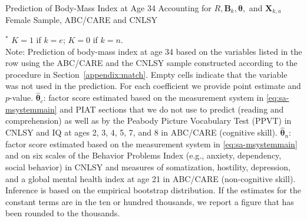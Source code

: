 \begin{table}
\begin{threeparttable}
\caption{Prediction of Body-Mass Index at Age 34 Accounting for $R, \bm{B}_k, \bm{\theta},$ and $\bm{X}_{k,a}$ Female Sample, ABC/CARE and CNLSY}
\centering
\scriptsize

\begin{tablenotes}
\footnotesize
\item $^\ast$ $K=1$ if $k=e$; $K=0$ if $k=n$.\\
Note: Prediction of body-mass index at age 34 based on the variables listed in the row using the ABC/CARE and the CNLSY sample constructed according to the procedure in Section~\ref{appendix:match}. Empty cells indicate that the variable was not used in the prediction. For each coefficient we provide point estimate and $p$-value. $\hat{\bm{\theta}}_{c}$: factor score estimated based on the measurement system in \eqref{eq:sa-msystemmain} and PIAT sections that we do not use to predict (reading and comprehension) as well as by the Peabody Picture Vocabulary Test (PPVT) in CNLSY and IQ at ages 2, 3, 4, 5, 7, and 8 in ABC/CARE (cognitive skill). $\hat{\bm{\theta}}_{n}$: factor score estimated based on the measurement system in \eqref{eq:sa-msystemmain} and on six scales of the Behavior Problems Index (e.g., anxiety, dependency, social behavior) in CNLSY and measures of somatization, hostility, depression, and a global mental health index at age 21 in ABC/CARE (non-cognitive skill). Inference is based on the empirical bootstrap distribution. If the estimates for the constant terms are in the ten or hundred thousands, we report a figure that has been rounded to the thousands.
\end{tablenotes}
\end{threeparttable}
\end{table}

